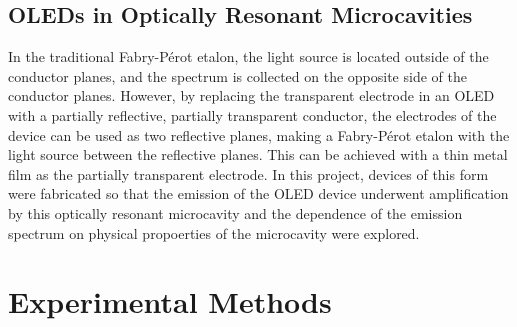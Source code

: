 \documentclass{report}
\begin{document}
    \section{OLEDs in Optically Resonant Microcavities}
        In the traditional Fabry-P\'erot etalon, the light source is located outside of the conductor planes, and the spectrum is collected on the opposite side of the conductor planes. However, by replacing the transparent electrode in an OLED with a partially reflective, partially transparent conductor, the electrodes of the device can be used as two reflective planes, making a Fabry-P\'erot etalon with the light source between the reflective planes. This can be achieved with a thin metal film as the partially transparent electrode. In this project, devices of this form were fabricated so that the emission of the OLED device underwent amplification by this optically resonant microcavity and the dependence of the emission spectrum on physical propoerties of the microcavity were explored.

\chapter{Experimental Methods} \label{methods}
\end{document}
